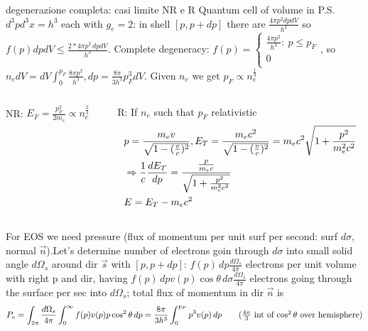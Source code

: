 \begin{frame}{degenerazione completa: casi limite NR e R}
    Quantum cell of volume in P.S. $d^3pd^3x=h^3$ each with $g_e=2$: in shell $[p,p+dp]$ there are $\frac{4\pi p^2dpdV}{h^3}$ so $f(p)dpdV\leq \frac{2*4\pi p^2\,dpdV}{h^3}$. Complete degeneracy: $f(p)=\left\{\begin{array}{l}
            \frac{4\pi p^2}{h^3}:\ p\leq p_F\\
            0\\
    \end{array}\right.$, so $n_edV=dV\int_0^{p_F}\frac{8\pi p^2}{h^3},dp=\frac{8\pi}{3h^3}p_F^3dV$. Given $n_e$ we get $p_F\propto n_e^{\frac{1}{3}}$
    \begin{columns}[T]
        \begin{column}{0.4\textwidth}
            NR: $E_F=\frac{p_F^2}{2m_e}\propto n_e^{\frac{2}{3}}$        
        \end{column}
        \begin{column}{0.6\textwidth}
            R: If $n_e$ such that $p_F$ relativistic
            \begin{align*}
                &p=\frac{m_ev}{\sqrt{1-(\frac{v}{c})^2}},E_T=\frac{m_ec^2}{\sqrt{1-(\frac{v}{c})^2}}=m_ec^2\sqrt{1+\frac{p^2}{m_e^2c^2}}\\
                &\Rightarrow \frac{1}{c}\TDy{p}{E_T}=\frac{\frac{p}{m_ec}}{\sqrt{1+\frac{p^2}{m_e^2c^2}}}\\
                &E=E_T-m_ec^2\\
            \end{align*}
        \end{column}
    \end{columns}
    For EOS we need pressure (flux of momentum per unit surf per second: surf $d\sigma$, normal $\vec{n}$).Let's determine number of electrons goin through $d\sigma$ into small solid angle $d\Omega_s$ around dir $\vec{s}$ with $[p,p+dp]$: $f(p)\,dp \frac{d\Omega_s}{4\pi}$ electrons per unit volume with right p and dir, having $f(p)\,dpv(p)\cos{\theta}\,d\sigma \frac{d\Omega_s}{4\pi}$ electrons going through the surface per sec into $d\Omega_s$; total flux of momentum in dir $\vec{n}$ is
    \begin{align*}
        &P_e=\int_{2\pi}\frac{d\Omega_s}{4\pi}\int_0^{\infty}f(p)v(p)p\cos^2{\theta}\,dp=\frac{8\pi}{3h^3}\int_0^{p_F}p^3v(p)\,dp\tag{$\frac{4\pi}{3}$ int of $\cos^2{\theta}$ over hemisphere}\\
        &
    \end{align*}
\end{frame}

